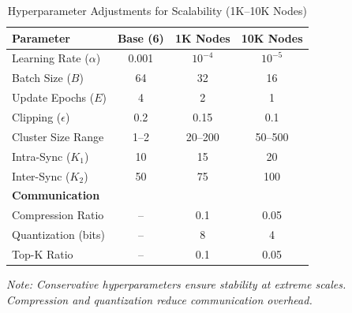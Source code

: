 
\begin{table}[t]
\centering
\caption{Hyperparameter Adjustments for Scalability (1K--10K Nodes)}
\label{tab:scalability_hyperparameters}
\begin{tabular}{@{}lccc@{}}
\toprule
\textbf{Parameter} & \textbf{Base (6)} & \textbf{1K Nodes} & \textbf{10K Nodes} \\
\midrule
Learning Rate ($\alpha$) & 0.001 & $10^{-4}$ & $10^{-5}$ \\
Batch Size ($B$) & 64 & 32 & 16 \\
Update Epochs ($E$) & 4 & 2 & 1 \\
Clipping ($\epsilon$) & 0.2 & 0.15 & 0.1 \\
Cluster Size Range & 1--2 & 20--200 & 50--500 \\
Intra-Sync ($K_1$) & 10 & 15 & 20 \\
Inter-Sync ($K_2$) & 50 & 75 & 100 \\
\midrule
\textbf{Communication} & & & \\
Compression Ratio & -- & 0.1 & 0.05 \\
Quantization (bits) & -- & 8 & 4 \\
Top-K Ratio & -- & 0.1 & 0.05 \\
\bottomrule
\end{tabular}
\vspace{0.1cm}
\footnotesize
\textit{Note: Conservative hyperparameters ensure stability at extreme scales. Compression and quantization reduce communication overhead.}
\end{table}
